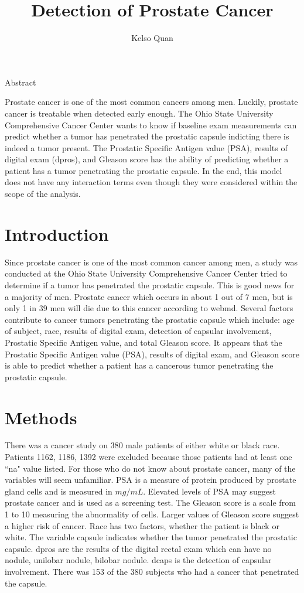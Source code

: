 \documentclass{article}\usepackage[]{graphicx}\usepackage[]{color}
\title{Detection of Prostate Cancer}
\author{Kelso Quan}
\begin{document}
 

\maketitle
\begin{center}
\Large{Abstract}
\end{center}

Prostate cancer is one of the most common cancers among men. Luckily, prostate cancer is treatable when detected early enough. The Ohio State University Comprehensive Cancer Center wants to know if baseline exam measurements can predict whether a tumor has penetrated the prostatic capsule indicting there is indeed a tumor present. The Prostatic Specific Antigen value (PSA), results of digital exam (dpros), and Gleason score has the ability of predicting whether a patient has a tumor penetrating the prostatic capsule. In the end, this model does not have any interaction terms even though they were considered within the scope of the analysis. 

\section{Introduction}
\qquad Since prostate cancer is one of the most common cancer among men, a study was conducted at the Ohio State University Comprehensive Cancer Center tried to determine if a tumor has penetrated the prostatic capsule. This is good news for a majority of men. Prostate cancer which occurs in about 1 out of 7 men, but is only 1 in 39 men will die due to this cancer according to webmd. Several factors contribute to cancer tumors penetrating the prostatic capsule which include: age of subject, race, results of digital exam, detection of capsular involvement, Prostatic Specific Antigen value, and total Gleason score. It appears that the Prostatic Specific Antigen value (PSA), results of digital exam, and Gleason score is able to predict whether a patient has a cancerous tumor penetrating the prostatic capsule. 



\section{Methods}
\qquad There was a cancer study on 380 male patients of either white or black race. Patients 1162, 1186, 1392 were excluded because those patients had at least one ``na" value listed. For those who do not know about prostate cancer, many of the variables will seem unfamiliar. PSA is a measure of protein produced by prostate gland cells and is measured in $mg/mL$. Elevated levels of PSA may suggest prostate cancer and is used as a screening test. The Gleason score is a scale from 1 to 10 measuring the abnormality of cells. Larger values of Gleason score suggest a higher risk of cancer. Race has two factors, whether the patient is black or white. The variable capsule indicates whether the tumor penetrated the prostatic capsule. dpros are the results of the digital rectal exam which can have no nodule, unilobar nodule, bilobar nodule. dcaps is the detection of capsular involvement. There was 153 of the 380 subjects who had a cancer that penetrated the capsule. 
\end{document}

